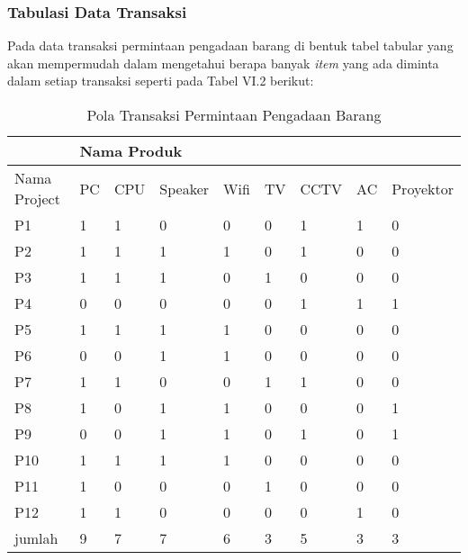 \subsubsection{Tabulasi Data Transaksi}
Pada data transaksi permintaan pengadaan barang di bentuk tabel tabular yang akan mempermudah dalam mengetahui berapa banyak \textit{item} yang ada diminta dalam setiap transaksi seperti pada Tabel VI.2 berikut:
\begin{table}[!h]
\caption{Pola Transaksi Permintaan Pengadaan Barang}
\begin{center}
\begin{tabular}{|l|l|l|l|l|l|l|l|l|}
\hline
             & \multicolumn{8}{l|}{Nama Produk}                       \\ \hline
Nama Project & PC & CPU & Speaker & Wifi & TV & CCTV & AC & Proyektor \\ \hline
P1           & 1  & 1   & 0       & 0    & 0  & 1    & 1  & 0         \\ \hline
P2           & 1  & 1   & 1       & 1    & 0  & 1    & 0  & 0         \\ \hline
P3           & 1  & 1   & 1       & 0    & 1  & 0    & 0  & 0         \\ \hline
P4           & 0  & 0   & 0       & 0    & 0  & 1    & 1  & 1         \\ \hline
P5           & 1  & 1   & 1       & 1    & 0  & 0    & 0  & 0         \\ \hline
P6           & 0  & 0   & 1       & 1    & 0  & 0    & 0  & 0         \\ \hline
P7           & 1  & 1   & 0       & 0    & 1  & 1    & 0  & 0         \\ \hline
P8           & 1  & 0   & 1       & 1    & 0  & 0    & 0  & 1         \\ \hline
P9           & 0  & 0   & 1       & 1    & 0  & 1    & 0  & 1         \\ \hline
P10          & 1  & 1   & 1       & 1    & 0  & 0    & 0  & 0         \\ \hline
P11          & 1  & 0   & 0       & 0    & 1  & 0    & 0  & 0         \\ \hline
P12          & 1  & 1   & 0       & 0    & 0  & 0    & 1  & 0         \\ \hline
jumlah       & 9  & 7   & 7       & 6    & 3  & 5    & 3  & 3         \\ \hline
\end{tabular}
\end{center}
\end{table}

